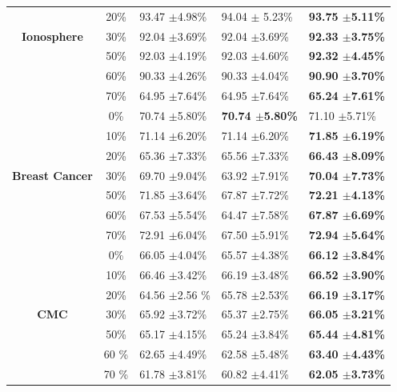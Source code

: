 \documentclass[12pt,a4paper,oneside,english]{report}
\begin{document}
\begin{table}[htbp]
\begin{tabular*}{\linewidth}{@{\extracolsep{\fill}} |c|clll| }
            ~ & 20\% & 93.47 \(\pm\)4.98\% & 94.04 \(\pm\) 5.23\%  &  \textbf{93.75 \(\pm\)5.11\%} \\
		\textbf{ Ionosphere } & 30\% & 92.04 $\pm$3.69\% & 92.04 $\pm$3.69\%  & \textbf{92.33 $\pm$3.75\%} \\ 
		~ & 50\% & 92.03 $\pm$4.19\% & 92.03 $\pm$4.60\%  & \textbf{92.32 $\pm$4.45\%}  \\
            ~ & 60\% & 90.33 \(\pm\)4.26\% & 90.33 \(\pm\)4.04\%  &  \textbf{90.90 \(\pm\)3.70\%} \\
            ~ & 70\% & 64.95 \(\pm\)7.64\% & 64.95 \(\pm\)7.64\%  &  \textbf{65.24 \(\pm\)7.61\%} \\
		\hline
		~ & 0\% & 70.74 $\pm$5.80\%  & \textbf{70.74 $\pm$5.80\%}  & 71.10 $\pm$5.71\%  \\ 
		~ & 10\% & 71.14 $\pm$6.20\%  & 71.14 $\pm$6.20\% & \textbf{71.85 $\pm$6.19\%}  \\ 
            ~ & 20\% & 65.36 \(\pm\)7.33\% & 65.56 \(\pm\)7.33\% & \textbf{66.43 \(\pm\)8.09\%} \\
		 \textbf{ Breast Cancer } & 30\% & 69.70 $\pm$9.04\% & 63.92 $\pm$7.91\% & \textbf{70.04 $\pm$7.73\%}  \\ 
		~ & 50\% & 71.85 $\pm$3.64\%  & 67.87 $\pm$7.72\% & \textbf{72.21 $\pm$4.13\%}  \\ 
            ~ & 60\% & 67.53 \(\pm\)5.54\% & 64.47 \(\pm\)7.58\% & \textbf{67.87 \(\pm\)6.69\%} \\
            ~ & 70\% & 72.91 \(\pm\)6.04\% & 67.50 \(\pm\)5.91\% & \textbf{72.94 \(\pm\)5.64\%} \\
		\hline
		~ & 0\% & 66.05 $\pm$4.04\%  & 65.57 $\pm$4.38\%  & \textbf{66.12 $\pm$3.84\%} \\ 
		~ & 10\% & 66.46 $\pm$3.42\%  & 66.19 $\pm$3.48\%  & \textbf{66.52 $\pm$3.90\%}  \\
            ~ & 20\% & 64.56 \(\pm\)2.56 \% & 65.78 \(\pm\)2.53\%  & \textbf{66.19 \(\pm\)3.17\%} \\ 
		\textbf{ CMC } & 30\% & 65.92 $\pm$3.72\%  & 65.37 $\pm$2.75\% & \textbf{66.05 $\pm$3.21\%} \\ 
		~ & 50\% & 65.17 $\pm$4.15\%  & 65.24 $\pm$3.84\%  & \textbf{65.44 $\pm$4.81\%}  \\ 
            ~ & 60 \% & 62.65 \(\pm\)4.49\%  & 62.58 \(\pm\)5.48\%  & \textbf{63.40 \(\pm\)4.43\%} \\
            ~ & 70 \% & 61.78 \(\pm\)3.81\%  & 60.82 \(\pm\)4.41\%  & \textbf{62.05 \(\pm\)3.73\%} \\
		\hline

\end{tabular*}
\end{table}
\end{document}
